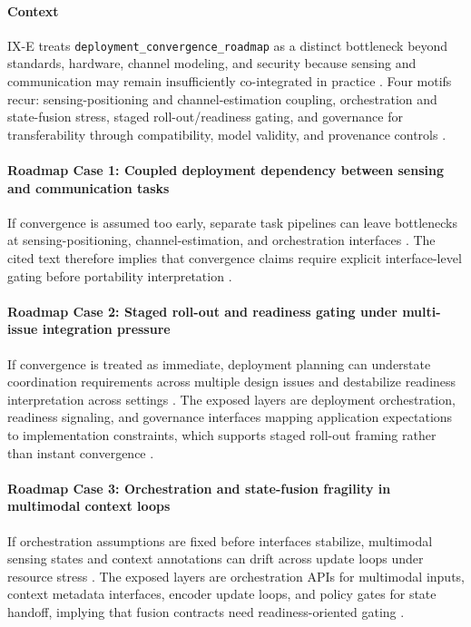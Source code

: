 \documentclass[letterpaper,journal]{IEEEtran}
\begin{document}
\paragraph{Context}
IX-E treats \texttt{deployment\_convergence\_roadmap} as a distinct bottleneck beyond standards, hardware, channel modeling, and security because sensing and communication may remain insufficiently co-integrated in practice \cite{O_ISAC_039}. Four motifs recur: sensing-positioning and channel-estimation coupling, orchestration and state-fusion stress, staged roll-out/readiness gating, and governance for transferability through compatibility, model validity, and provenance controls \cite{O_ISAC_039, O_ISAC_151, O_ISAC_163, O_ISAC_200}.

\paragraph{Roadmap Case 1: Coupled deployment dependency between sensing and communication tasks}
If convergence is assumed too early, separate task pipelines can leave bottlenecks at sensing-positioning, channel-estimation, and orchestration interfaces \cite{O_ISAC_039}. The cited text therefore implies that convergence claims require explicit interface-level gating before portability interpretation \cite{O_ISAC_039}.

\paragraph{Roadmap Case 2: Staged roll-out and readiness gating under multi-issue integration pressure}
If convergence is treated as immediate, deployment planning can understate coordination requirements across multiple design issues and destabilize readiness interpretation across settings \cite{O_ISAC_163}. The exposed layers are deployment orchestration, readiness signaling, and governance interfaces mapping application expectations to implementation constraints, which supports staged roll-out framing rather than instant convergence \cite{O_ISAC_163}.

\paragraph{Roadmap Case 3: Orchestration and state-fusion fragility in multimodal context loops}
If orchestration assumptions are fixed before interfaces stabilize, multimodal sensing states and context annotations can drift across update loops under resource stress \cite{O_ISAC_151}. The exposed layers are orchestration APIs for multimodal inputs, context metadata interfaces, encoder update loops, and policy gates for state handoff, implying that fusion contracts need readiness-oriented gating \cite{O_ISAC_151}.
\end{document}
